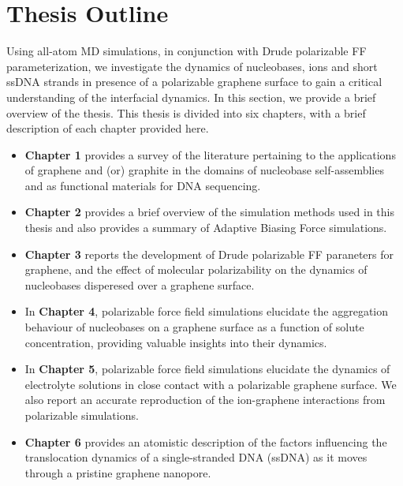 \section{Thesis Outline}
 Using all-atom MD simulations, in conjunction with Drude polarizable FF parameterization, we investigate the dynamics of nucleobases, ions and short ssDNA strands in presence of a polarizable graphene surface to gain a critical understanding of the interfacial dynamics. In this section, we provide a brief overview of the thesis. This thesis is divided into six chapters, with a brief description of each chapter provided here.

\begin{itemize}
    \item \textbf{Chapter 1} provides a survey of the literature pertaining to the applications of graphene and (or) graphite in the domains of nucleobase self-assemblies and as functional materials for DNA sequencing. 
    \item \textbf{Chapter 2} provides a brief overview of the simulation methods used in this thesis and also provides a summary of Adaptive Biasing Force simulations.
    \item \textbf{Chapter 3} reports the development of Drude polarizable FF paraneters for graphene, and the effect of molecular polarizability on the dynamics of nucleobases disperesed over a graphene surface.
    \item In \textbf{Chapter 4}, polarizable force field simulations elucidate the aggregation behaviour of nucleobases on a graphene surface as a function of solute concentration, providing valuable insights into their dynamics.
    \item In \textbf{Chapter 5}, polarizable force field simulations elucidate the dynamics of electrolyte solutions in close contact with a polarizable graphene surface. We also report an accurate reproduction of the ion-graphene interactions from polarizable simulations.  
    \item \textbf{Chapter 6} provides an atomistic description of the factors influencing the translocation dynamics of a single-stranded DNA (ssDNA) as it moves through a pristine graphene nanopore.
\end{itemize}

